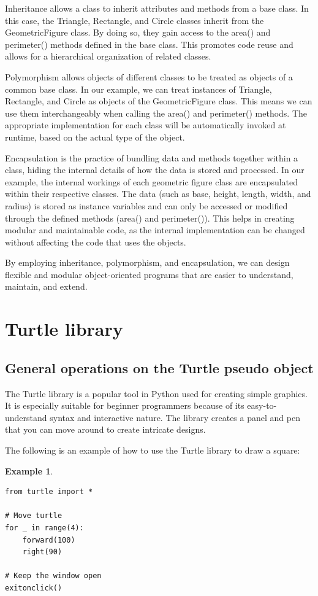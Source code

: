 \documentclass[12pt]{article}
\newtheorem{Example}{Example}[section]
\begin{document}
Inheritance allows a class to inherit attributes and methods from a base class. In this case, the Triangle, Rectangle, and Circle classes inherit from the GeometricFigure class. By doing so, they gain access to the area() and perimeter() methods defined in the base class. This promotes code reuse and allows for a hierarchical organization of related classes.

Polymorphism allows objects of different classes to be treated as objects of a common base class. In our example, we can treat instances of Triangle, Rectangle, and Circle as objects of the GeometricFigure class. This means we can use them interchangeably when calling the area() and perimeter() methods. The appropriate implementation for each class will be automatically invoked at runtime, based on the actual type of the object.

Encapsulation is the practice of bundling data and methods together within a class, hiding the internal details of how the data is stored and processed. In our example, the internal workings of each geometric figure class are encapsulated within their respective classes. The data (such as base, height, length, width, and radius) is stored as instance variables and can only be accessed or modified through the defined methods (area() and perimeter()). This helps in creating modular and maintainable code, as the internal implementation can be changed without affecting the code that uses the objects.

By employing inheritance, polymorphism, and encapsulation, we can design flexible and modular object-oriented programs that are easier to understand, maintain, and extend.

\newpage
\section{Turtle library}
\subsection{General operations on the Turtle pseudo object}
The Turtle library is a popular tool in Python used for creating simple graphics. It is especially suitable for beginner programmers because of its easy-to-understand syntax and interactive nature. The library creates a panel and pen that you can move around to create intricate designs.

The following is an example of how to use the Turtle library to draw a square:

\begin{Example}
\begin{lstlisting}
from turtle import *

# Move turtle
for _ in range(4):
    forward(100)
    right(90)

# Keep the window open
exitonclick()
\end{lstlisting}
\end{Example}
\end{document}
